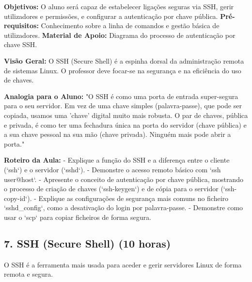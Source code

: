 \documentclass[10pt,a4paper]{article}
\newcommand{\guia}[1]{%
	\begin{tcolorbox}[
		colback=lightgray,
		colframe=darkblue,
		boxrule=1pt,
		arc=4mm,
		title=\textbf{Guia do Formador},
		fonttitle=\bfseries,
		coltitle=darkblue,
		boxsep=5pt,
		left=5mm, right=5mm, top=3mm, bottom=3mm
		]
		#1
	\end{tcolorbox}
}
\begin{document}
	\guia{
		\textbf{Objetivos:} O aluno será capaz de estabelecer ligações seguras via SSH, gerir utilizadores e permissões, e configurar a autenticação por chave pública.
		\textbf{Pré-requisitos:} Conhecimento sobre a linha de comandos e gestão básica de utilizadores.
		\textbf{Material de Apoio:} Diagrama do processo de autenticação por chave SSH.
		
		\textbf{Visão Geral:} O SSH (Secure Shell) é a espinha dorsal da administração remota de sistemas Linux. O professor deve focar-se na segurança e na eficiência do uso de chaves.
		
		\textbf{Analogia para o Aluno:} "O SSH é como uma porta de entrada super-segura para o seu servidor. Em vez de uma chave simples (palavra-passe), que pode ser copiada, usamos uma 'chave' digital muito mais robusta. O par de chaves, pública e privada, é como ter uma fechadura única na porta do servidor (chave pública) e a sua chave pessoal na sua mão (chave privada). Ninguém mais pode abrir a porta."
		
		\textbf{Roteiro da Aula:}
		- Explique a função do SSH e a diferença entre o cliente (`ssh`) e o servidor (`sshd`).
		- Demonstre o acesso remoto básico com `ssh user@host`.
		- Apresente o conceito de autenticação por chave pública, mostrando o processo de criação de chaves (`ssh-keygen`) e de cópia para o servidor (`ssh-copy-id`).
		- Explique as configurações de segurança mais comuns no ficheiro `sshd_config`, como a desativação do login por palavra-passe.
		- Demonstre como usar o `scp` para copiar ficheiros de forma segura.
	}
	\subsection*{7. SSH (Secure Shell) (10 horas)}
	\vspace{-1em}
	\paragraph{}
	O SSH é a ferramenta mais usada para aceder e gerir servidores Linux de forma remota e segura.
	
\end{document}
